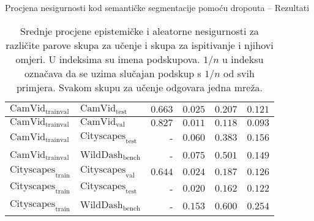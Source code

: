 \documentclass{beamer}
\begin{document}
\begin{frame}[allowframebreaks=0.9]{Procjena nesigurnosti kod semantičke segmentacije pomoću dropouta -- Rezultati}
\begin{table}
\begin{tabular}{llrrrr}
			\midrule
			$\text{CamVid}_\text{trainval}$ & $\text{CamVid}_\text{test}$ & $0.663$ & $0.025$ & $0.207$ & $0.121$ \\
			\midrule
			$\text{CamVid}_\text{trainval}$     & $\text{CamVid}_\text{val}$ & $0.827$ & $0.011$ & $0.118$ & $0.093$ \\
			\midrule
			$\text{CamVid}_\text{trainval}$  & $\text{Cityscapes}_\text{test}$ &      -  & $0.060$ & $0.383$ & $0.156$ \\
			$\text{CamVid}_\text{trainval}$  & 	$\text{WildDash}_\text{bench}$	 &      -  & $0.075$ & $0.501$ & $0.149$ \\
			\midrule
			$\text{Cityscapes}_\text{train}$ & $\text{Cityscapes}_\text{val}$  & $0.644$ & $0.024$ & $0.187$ & $0.126$ \\
			$\text{Cityscapes}_\text{train}$ & $\text{Cityscapes}_\text{test}$ & -       & $0.020$ & $0.162$ & $0.122$ \\
			$\text{Cityscapes}_\text{train}$ & $\text{WildDash}_\text{bench}$  & - & $0.153$ & $0.600$ & $0.254$ \\
			\bottomrule
		\end{tabular}
		\caption{Srednje procjene epistemičke i aleatorne nesigurnosti za različite parove skupa za učenje i skupa za ispitivanje i njihovi omjeri. U indeksima su imena podskupova. $1/n$ u indeksu označava da se uzima slučajan podskup s $1/n$ od svih primjera. Svakom skupu za učenje odgovara jedna mreža.}
		\label{tab:epistemicka-aleatorna-ucenje-testiranje}
	\end{table}
	

\end{frame}
\end{document}
